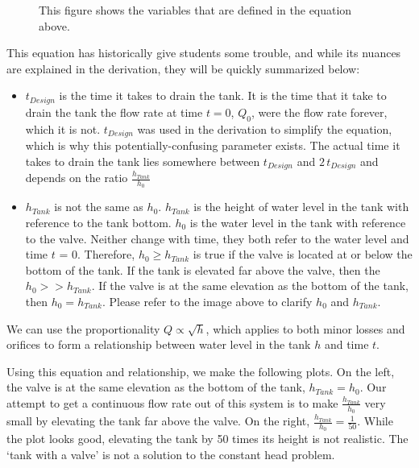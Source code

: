 \documentclass[letterpaper,10pt,english]{sphinxmanual}
\let\sphinxpxdimen\pdfpxdimen\else\newdimen\sphinxpxdimen
\begin{document}
\begin{figure}[htbp]
\centering
\capstart

\noindent\sphinxincludegraphics[width=600\sphinxpxdimen]{{hypochlorinator_variable_explanation}.png}
\caption{This figure shows the variables that are defined in the equation above.}\label{\detokenize{Flow_Control_and_Measurement/FCM_Design:id13}}\label{\detokenize{Flow_Control_and_Measurement/FCM_Design:hypochlorinator-variable-explanation-design}}\end{figure}

This equation has historically give students some trouble, and while its nuances are explained in the derivation, they will be quickly summarized below:
\begin{itemize}
\item {} 
\(t_{Design}\) is  the time it takes to drain the tank. It is the time that it  take to drain the tank  the flow rate at time \(t = 0\), \(Q_0\), were the flow rate forever, which it is not. \(t_{Design}\) was used in the derivation to simplify the equation, which is why this potentially-confusing parameter exists. The actual time it takes to drain the tank lies somewhere between \(t_{Design}\) and \(2 \, t_{Design}\) and depends on the ratio \(\frac{h_{Tank}}{h_0}\)

\item {} 
\(h_{Tank}\) is not the same as \(h_{0}\). \(h_{Tank}\) is the height of water level in the tank with reference to the tank bottom. \(h_{0}\) is the water level in the tank with reference to the valve. Neither change with time, they both refer to the water level and time \(t\) = 0. Therefore, \(h_{0} \geq h_{Tank}\) is true if the valve is located at or below the bottom of the tank. If the tank is elevated far above the valve, then the \(h_{0} > > h_{Tank}\). If the valve is at the same elevation as the bottom of the tank, then \(h_{0} = h_{Tank}\). Please refer to the image above to clarify \(h_{0}\) and \(h_{Tank}\).

\end{itemize}

We can use the proportionality \(Q \propto \sqrt{h}\), which applies to both minor losses and orifices to form a relationship between water level in the tank \(h\) and time \(t\).

Using this equation and relationship, we make the following plots. On the left, the valve is at the same elevation as the bottom of the tank, \(h_{Tank} = h_0\). Our attempt to get a continuous flow rate out of this system is to make \(\frac{h_{Tank}}{h_0}\) very small by elevating the tank far above the valve. On the right, \(\frac{h_{Tank}}{h_0} = \frac{1}{50}\). While the plot looks good, elevating the tank by 50 times its height is not realistic. The ‘tank with a valve’ is not a solution to the constant head problem.
\end{document}
